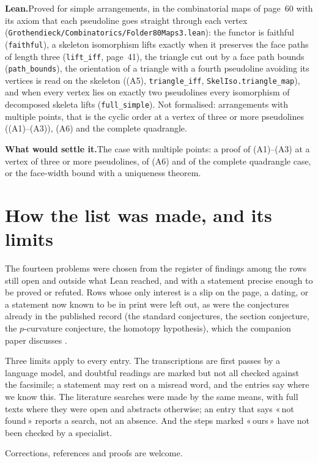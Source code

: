 \documentclass[11pt]{article}
\newcommand{\q}[1]{«\,#1\,»}
\theoremstyle{definition}
\theoremstyle{plain}\newtheorem*{proposition}{Proposition}\theoremstyle{definition}
\newcommand{\entry}[1]{\par\medskip\noindent\textbf{#1}\enspace}
\newcommand{\leanst}{\entry{Lean.}}
\newcommand{\settle}{\entry{What would settle it.}}
\begin{document}
\leanst Proved for simple arrangements, in the combinatorial maps of page~60 with its axiom that each pseudoline goes straight through each vertex (\nolinkurl{Grothendieck/Combinatorics/Folder80Maps3.lean}): the functor is faithful (\texttt{faithful}), a skeleton isomorphism lifts exactly when it preserves the face paths of length three (\texttt{lift\_iff}, page~41), the triangle cut out by a face path bounds (\texttt{path\_bounds}), the orientation of a triangle with a fourth pseudoline avoiding its vertices is read on the skeleton ((A5), \texttt{triangle\_iff}, \texttt{SkelIso.triangle\_map}), and when every vertex lies on exactly two pseudolines every isomorphism of decomposed skeleta lifts (\texttt{full\_simple}). Not formalised: arrangements with multiple points, that is the cyclic order at a vertex of three or more pseudolines ((A1)--(A3)), (A6) and the complete quadrangle.

\settle The case with multiple points: a proof of (A1)--(A3) at a vertex of three or more pseudolines, of (A6) and of the complete quadrangle case, or the face-width bound with a uniqueness theorem.

\section{How the list was made, and its limits}

The fourteen problems were chosen from the register of findings among the rows still open and outside what Lean reached, and with a statement precise enough to be proved or refuted. Rows whose only interest is a slip on the page, a dating, or a statement now known to be in print were left out, as were the conjectures already in the published record (the standard conjectures, the section conjecture, the $p$-curvature conjecture, the homotopy hypothesis), which the companion paper discusses \cite{huacicm}.

Three limits apply to every entry. The transcriptions are first passes by a language model, and doubtful readings are marked but not all checked against the facsimile; a statement may rest on a misread word, and the entries say where we know this. The literature searches were made by the same means, with full texts where they were open and abstracts otherwise; an entry that says \q{not found} reports a search, not an absence. And the steps marked \q{ours} have not been checked by a specialist.

Corrections, references and proofs are welcome.
\end{document}
